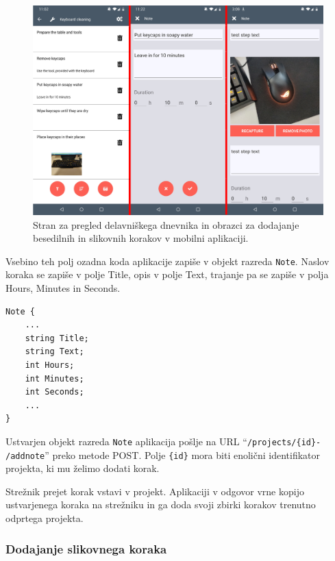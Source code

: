 \documentclass[a4paper, 12pt]{book}
\begin{document}
\begin{figure}[H]
\begin{center}
	\includegraphics[width=13.5cm]{app_project_note}
\end{center}
	\caption{Stran za pregled delavniškega dnevnika in obrazci za dodajanje besedilnih in slikovnih korakov v mobilni aplikaciji.}
\label{app_project_note}
\end{figure}

Vsebino teh polj ozadna koda aplikacije zapiše v objekt razreda \texttt{Note}.
Naslov koraka se zapiše v polje Title, opis v polje Text, trajanje pa se zapiše v polja Hours, Minutes in Seconds.
\begin{verbatim}
Note { 
    ... 
    string Title; 
    string Text; 
    int Hours; 
    int Minutes;
    int Seconds;
    ...
}
\end{verbatim}

Ustvarjen objekt razreda \texttt{Note} aplikacija pošlje na URL \enquote{\texttt{/projects/\{id\}-\\/addnote}} preko metode POST.
Polje \texttt{\{id\}} mora biti enolični identifikator projekta, ki mu želimo dodati korak.

Strežnik prejet korak vstavi v projekt.
Aplikaciji v odgovor vrne kopijo ustvarjenega koraka na strežniku in ga doda svoji zbirki korakov trenutno odprtega projekta.



\subsubsection{Dodajanje slikovnega koraka}
\end{document}
